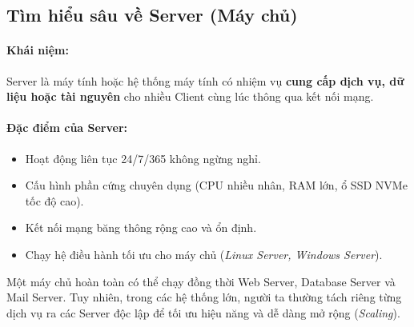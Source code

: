 \documentclass[11pt,oneside]{book}
\newcommand{\thd}[1]{\textcolor{white}{\textbf{\strut #1}}}
\begin{document}
\subsection{Tìm hiểu sâu về Server (Máy chủ)}

\paragraph{Khái niệm:} Server là máy tính hoặc hệ thống máy tính có nhiệm vụ \textbf{cung cấp dịch vụ, dữ liệu hoặc tài nguyên} cho nhiều Client cùng lúc thông qua kết nối mạng.

\paragraph{Đặc điểm của Server:}
\begin{itemize}
    \item Hoạt động liên tục 24/7/365 không ngừng nghỉ.
    \item Cấu hình phần cứng chuyên dụng (CPU nhiều nhân, RAM lớn, ổ SSD NVMe tốc độ cao).
    \item Kết nối mạng băng thông rộng cao và ổn định.
    \item Chạy hệ điều hành tối ưu cho máy chủ (\textit{Linux Server, Windows Server}).
\end{itemize}

\begin{prettyTableBox}
\end{prettyTableBox}

\begin{tipBox}
Một máy chủ hoàn toàn có thể chạy đồng thời Web Server, Database Server và Mail Server. Tuy nhiên, trong các hệ thống lớn, người ta thường tách riêng từng dịch vụ ra các Server độc lập để tối ưu hiệu năng và dễ dàng mở rộng (\textit{Scaling}).
\end{tipBox}
\end{document}

